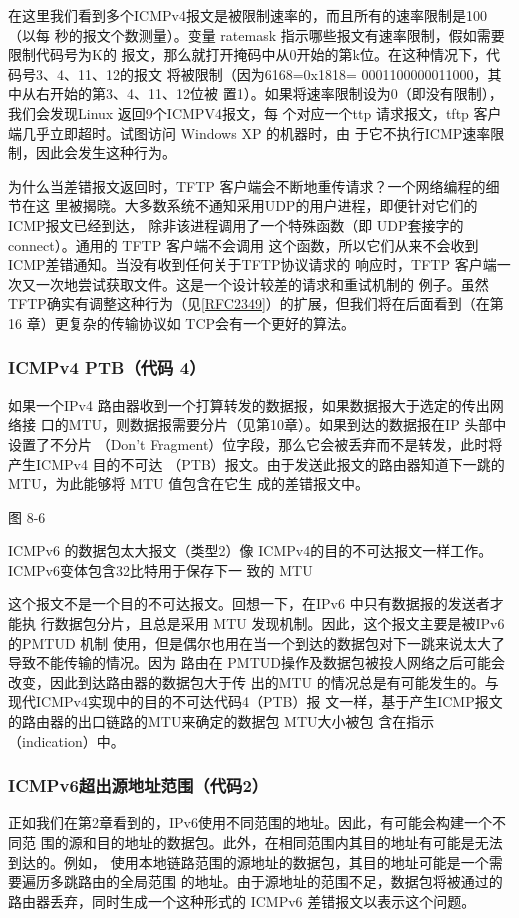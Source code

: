 在这里我们看到多个ICMPv4报文是被限制速率的，而且所有的速率限制是100（以每
秒的报文个数测量）。变量 ratemask 指示哪些报文有速率限制，假如需要限制代码号为K的
报文，那么就打开掩码中从0开始的第k位。在这种情况下，代码号3、4、11、12的报文
将被限制（因为6168=0x1818= 0001100000011000，其中从右开始的第3、4、11、12位被
置1）。如果将速率限制设为0（即没有限制），我们会发现Linux 返回9个ICMPV4报文，每
个对应一个ttp 请求报文，tftp 客户端几乎立即超时。试图访问 Windows XP 的机器时，由
于它不执行ICMP速率限制，因此会发生这种行为。

为什么当差错报文返回时，TFTP 客户端会不断地重传请求？一个网络编程的细节在这
里被揭晓。大多数系统不通知采用UDP的用户进程，即便针对它们的ICMP报文已经到达，
除非该进程调用了一个特殊函数（即 UDP套接字的 connect）。通用的 TFTP 客户端不会调用
这个函数，所以它们从来不会收到ICMP差错通知。当没有收到任何关于TFTP协议请求的
响应时，TFTP 客户端一次又一次地尝试获取文件。这是一个设计较差的请求和重试机制的
例子。虽然 TFTP确实有调整这种行为（见\href{https://www.rfc-editor.org/rfc/rfc2349}{[RFC2349]}）的扩展，但我们将在后面看到（在第
16 章）更复杂的传输协议如 TCP会有一个更好的算法。

\subsubsection{ICMPv4 PTB（代码 4）}
如果一个IPv4 路由器收到一个打算转发的数据报，如果数据报大于选定的传出网络接
口的MTU，则数据报需要分片（见第10章）。如果到达的数据报在IP 头部中设置了不分片
（Don't Fragment）位字段，那么它会被丢弃而不是转发，此时将产生ICMPv4 目的不可达
（PTB）报文。由于发送此报文的路由器知道下一跳的MTU，为此能够将 MTU 值包含在它生
成的差错报文中。

图 8-6

ICMPv6 的数据包太大报文（类型2）像
ICMPv4的目的不可达报文一样工作。
ICMPv6变体包含32比特用于保存下一
致的 MTU


这个报文不是一个目的不可达报文。回想一下，在IPv6 中只有数据报的发送者才能执
行数据包分片，且总是采用 MTU 发现机制。因此，这个报文主要是被IPv6 的PMTUD 机制
使用，但是偶尔也用在当一个到达的数据包对下一跳来说太大了导致不能传输的情况。因为
路由在 PMTUD操作及数据包被投人网络之后可能会改变，因此到达路由器的数据包大于传
出的MTU 的情况总是有可能发生的。与现代ICMPv4实现中的目的不可达代码4（PTB）报
文一样，基于产生ICMP报文的路由器的出口链路的MTU来确定的数据包 MTU大小被包
含在指示（indication）中。

\subsubsection{ICMPv6超出源地址范围（代码2）}
正如我们在第2章看到的，IPv6使用不同范围的地址。因此，有可能会构建一个不同范
围的源和目的地址的数据包。此外，在相同范围内其目的地址有可能是无法到达的。例如，
使用本地链路范围的源地址的数据包，其目的地址可能是一个需要遍历多跳路由的全局范围
的地址。由于源地址的范围不足，数据包将被通过的路由器丢弃，同时生成一个这种形式的
ICMPv6 差错报文以表示这个问题。

